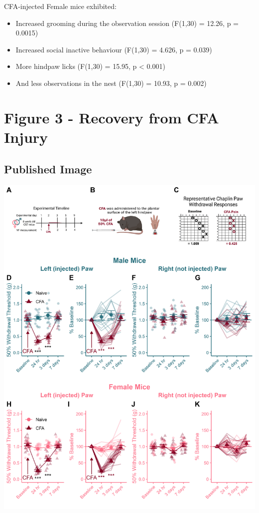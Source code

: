 \documentclass[
]{book}
\providecommand{\tightlist}{%
  \setlength{\itemsep}{0pt}\setlength{\parskip}{0pt}}
\begin{document}
CFA-injected Female mice exhibited:

\begin{itemize}
\tightlist
\item
  Increased grooming during the observation session (F(1,30) = 12.26, p = 0.0015)
\item
  Increased social inactive behaviour (F(1,30) = 4.626, p = 0.039)
\item
  More hindpaw licks (F(1,30) = 15.95, p \textless{} 0.001)
\item
  And less observations in the nest (F(1,30) = 10.93, p = 0.002)
\end{itemize}

\hypertarget{figure-3---recovery-from-cfa-injury}{%
\chapter*{Figure 3 - Recovery from CFA Injury}\label{figure-3---recovery-from-cfa-injury}}

\hypertarget{published-image-2}{%
\section*{Published Image}\label{published-image-2}}

\begin{center}\includegraphics[width=68.06in]{Figs/3_VF_CFA_Recovery} \end{center}
\end{document}
